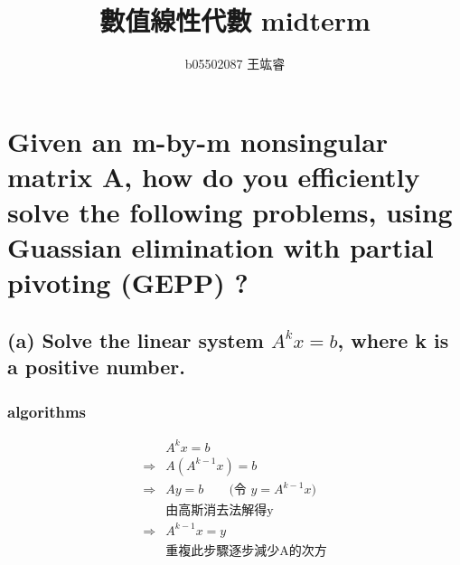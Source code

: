 \documentclass[12pt]{article}
\author{b05502087 王竑睿}
\date{}
\title{數值線性代數 midterm}
\begin{document}
\maketitle
    \section{Given an m-by-m nonsingular matrix A, how do you efficiently solve
    the following problems, using Guassian elimination with partial pivoting (GEPP) ?}
        \subsection*{(a) Solve the linear system $A^kx = b$, where k is a positive number.}
            \subsubsection*{algorithms}
                \begin{equation*}
                    \begin{aligned}
                        &A^kx=b\\
                        \Rightarrow &A(A^{k-1}x)=b\\
                        \Rightarrow &Ay=b  \qquad \text{(令 $y=A^{k-1}x$)}\\
                        &\text{由高斯消去法解得y}\\
                        \Rightarrow &A^{k-1}x=y\\
                        &\text{重複此步驟逐步減少A的次方}\\
                    \end{aligned}    
                \end{equation*}
\end{document}
